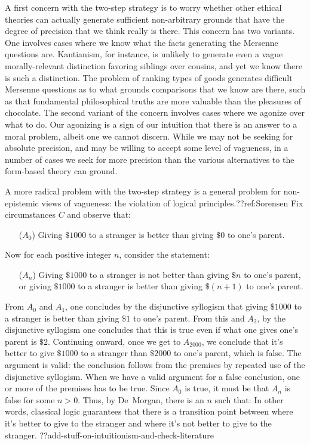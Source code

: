 A first concern with the two-step strategy is to worry whether other ethical theories can actually generate sufficient non-arbitrary grounds
that have the degree of precision that we think really is there. 
This concern has two variants. One involves cases where we know what the facts generating the Mersenne questions are.
Kantianism, for instance, is unlikely to generate even a vague morally-relevant 
distinction favoring siblings over cousins, and yet we know there is such a distinction. The problem of ranking types of goods generates difficult 
Mersenne questions as to what grounds comparisons that we know are there, such as that fundamental philosophical truths are more valuable than the 
pleasures of chocolate. The second variant of the concern involves cases where we agonize over what to do. Our agonizing is a sign of our intuition
that there is an answer to a moral problem, albeit one we cannot discern. While we may not be seeking for absolute precision, and may be willing
to accept some level of vagueness, in a number of cases we seek for more precision than the various alternatives to the form-based theory can ground. 

A more radical problem with the two-step strategy is a general problem for non-epistemic views of vagueness: the violation
of logical principles.??ref:Sorensen Fix circumstances $C$ and observe that:
\begin{itemize}
\item[($A_0$)] Giving $ \$1000$ to a stranger is better than giving $ \$0$ to one's parent.
\end{itemize}

Now for each positive integer $n$, consider the statement:
\begin{itemize}
\item[($A_n$)] Giving $ \$1000$ to a stranger is not better than giving $ \$n$ to one's parent, or giving  $ \$1000$ to a stranger is better than giving
    $ \$(n+1)$ to one's parent.
\end{itemize}

From $A_0$ and $A_1$, one concludes by the disjunctive syllogism that giving $ \$1000$ to a stranger is better than giving $ \$1$ to one's parent.
From this and $A_2$, by the disjunctive syllogism one concludes that this is true even if what one gives one's parent is $ \$2$. Continuing onward,
once we get to $A_{2000}$, we conclude that it's better to give $ \$1000$ to a stranger than $ \$2000$ to one's parent, which is false. The argument
is valid: the conclusion follows from the premises by repeated use of the disjunctive syllogism. When we have a valid argument for a false 
conclusion, one or more of the premises has to be true. Since $A_0$ is true, it must be that $A_n$ is false for some $n>0$. Thus, by De~Morgan,
there is an $n$ such that:
In other words, classical logic guarantees that there is a transition point between where it's better to give to the stranger and where it's not better to give to the stranger.
??add-stuff-on-intuitionism-and-check-literature

